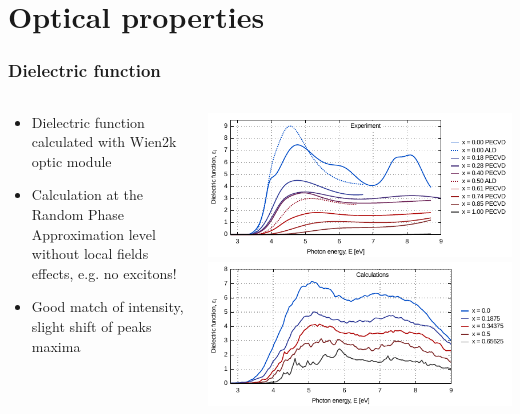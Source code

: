 \documentclass[noamsthm,8pt,t]{beamer}
\begin{document}
\section{Optical properties}

\begin{frame}
   \frametitle{Dielectric function}

   \begin{columns}
      \begin{column}{0.3\textwidth}
         \begin{itemize}
            \item Dielectric function calculated with Wien2k optic module 
            \item Calculation at the Random Phase Approximation level without local fields effects, e.g. no excitons!
            \item Good match of intensity, slight shift of peaks maxima
         \end{itemize}
      \end{column}
      \begin{column}{0.7\textwidth}
         \begin{center}
            \includegraphics[width=\linewidth]{figures/epsi.pdf}
            \newline
            \includegraphics[width=\linewidth]{figures/epsi-calc.pdf}
         \end{center}
      \end{column}
   \end{columns}
\end{frame}
\end{document}
